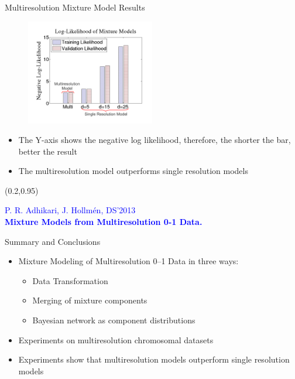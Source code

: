 \documentclass[first=dgreen,second=purple,logo=redexc]{aaltoslides}
\newcommand\FrameText[1]{%
  \begin{textblock*}{0.98\textwidth}(0.2\textwidth,0.95\textheight)
    \textcolor {blue}{\scriptsize\raggedright #1\hspace{0.1\textwidth}}
  \end{textblock*}}
\begin{document}
\begin{frame} {Multiresolution Mixture Model Results} 

      \begin{figure}
      \centering
      \includegraphics[trim=1cm 0.5cm 1cm 1cm, clip=true, width=0.5\textwidth]{figures/barlkhood}
      \end{figure}
      
      \vspace{-5mm}
      
      \begin{itemize}\setlength{\itemsep}{1mm}
      
\small
\item The Y-axis shows the negative log likelihood, therefore, the shorter the bar, better the result
\item The multiresolution model outperforms single resolution models
\end{itemize}
\FrameText{P. R. Adhikari, J. Hollm{\'e}n, DS'2013 \\ \vspace{-2mm} \textbf{Mixture Models from Multiresolution 0-1 Data.}}

\end{frame}


\begin{frame}{Summary and Conclusions}

\begin{itemize} \setlength{\itemsep}{5.5mm}
 \item Mixture Modeling of Multiresolution 0--1 Data in three ways:
 \begin{itemize} \setlength{\itemsep}{4mm}
  \item Data Transformation 
  \item Merging of mixture components
  \item Bayesian network as component distributions
 \end{itemize}
 \item Experiments on multiresolution chromosomal datasets
 \item Experiments show that multiresolution models outperform single resolution models
\end{itemize}
\end{frame}
\end{document}
